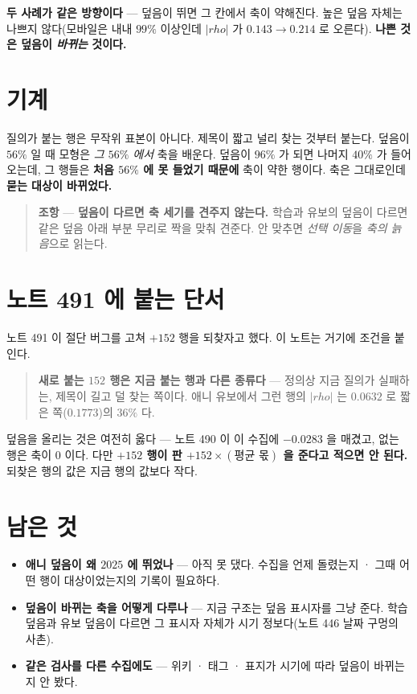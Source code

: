 \documentclass[11pt]{article}
\begin{document}
\textbf{두 사례가 같은 방향이다} --- 덮음이 뛰면 그 칸에서 축이 약해진다.
높은 덮음 자체는 나쁘지 않다(모바일은 내내 $99\%$ 이상인데 $|rho|$ 가
$0.143 \to 0.214$ 로 오른다). \textbf{나쁜 것은 덮음이 \emph{바뀌는}
것이다.}

\section{기계}

질의가 붙는 행은 무작위 표본이 아니다. 제목이 짧고 널리 찾는 것부터
붙는다. 덮음이 $56\%$ 일 때 모형은 \emph{그 $56\%$ 에서} 축을 배운다.
덮음이 $96\%$ 가 되면 나머지 $40\%$ 가 들어오는데, 그 행들은 \textbf{처음
$56\%$ 에 못 들었기 때문에} 축이 약한 행이다. 축은 그대로인데 \textbf{묻는
대상이 바뀌었다.}

\begin{quote}
\textbf{조항} --- \textbf{덮음이 다르면 축 세기를 견주지 않는다.} 학습과
유보의 덮음이 다르면 같은 덮음 아래 부분 무리로 짝을 맞춰 견준다. 안
맞추면 \emph{선택 이동}을 \emph{축의 늙음}으로 읽는다.
\end{quote}

\section{노트 491 에 붙는 단서}

노트 491 이 절단 버그를 고쳐 $+152$ 행을 되찾자고 했다. 이 노트는 거기에
조건을 붙인다.

\begin{quote}
\textbf{새로 붙는 $152$ 행은 지금 붙는 행과 다른 종류다} --- 정의상 지금
질의가 실패하는, 제목이 길고 덜 찾는 쪽이다. 애니 유보에서 그런 행의
$|rho|$ 는 $0.0632$ 로 짧은 쪽($0.1773$)의 $36\%$ 다.
\end{quote}

덮음을 올리는 것은 여전히 옳다 --- 노트 490 이 이 수집에 $-0.0283$ 을
매겼고, 없는 행은 축이 $0$ 이다. 다만 \textbf{$+152$ 행이 판 $+152 \times
(\text{평균 몫})$ 을 준다고 적으면 안 된다.} 되찾은 행의 값은 지금 행의
값보다 작다.

\section*{남은 것}

\begin{itemize}
\item \textbf{애니 덮음이 왜 $2025$ 에 뛰었나} --- 아직 못 댔다. 수집을
언제 돌렸는지 · 그때 어떤 행이 대상이었는지의 기록이 필요하다.
\item \textbf{덮음이 바뀌는 축을 어떻게 다루나} --- 지금 구조는 덮음
표시자를 그냥 준다. 학습 덮음과 유보 덮음이 다르면 그 표시자 자체가
시기 정보다(노트 446 날짜 구멍의 사촌).
\item \textbf{같은 검사를 다른 수집에도} --- 위키 · 태그 · 표지가 시기에
따라 덮음이 바뀌는지 안 봤다.
\end{itemize}
\end{document}
